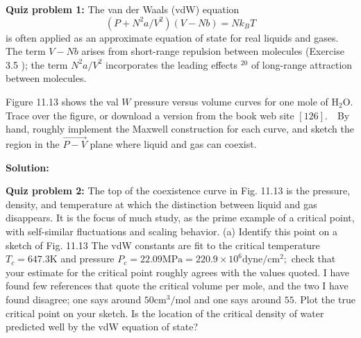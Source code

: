 \documentclass[10pt]{article}
\newenvironment{Solution}
    {\textbf{Solution:}
    
    \vspace{5mm}
    \begin{tcolorbox}
    }
    {
    \end{tcolorbox}
    \vspace{5mm}
    }
\begin{document}
\noindent\textbf{Quiz problem 1:}  The van der Waals (vdW) equation
$$
\left(P+N^{2} a / V^{2}\right)(V-N b)=N k_{B} T
$$
is often applied as an approximate equation of state for real liquids and gases. The term $V-N b$ arises from short-range repulsion between molecules (Exercise 3.5 ); the term $N^{2} a / V^{2}$ incorporates the leading effects $^{20}$ of long-range attraction between molecules.

Figure 11.13 shows the val $W$ pressure versus volume curves for one mole of $\mathrm{H}_{2} \mathrm{O}$. Trace over the figure, or download a version from the book web site $[126] . \quad$By hand, roughly implement the
Maxwell construction for each curve, and sketch
the region in the $\overrightarrow{P-V}$ plane where liquid and gas can coexist.

\begin{Solution}

\end{Solution}


\noindent\textbf{Quiz problem 2:} The top of the coexistence curve in Fig. 11.13 is the pressure, density, and temperature at which the distinction between liquid and gas disappears. It is the focus of much study, as the prime example of a critical point, with self-similar fluctuations and scaling behavior.
(a) Identify this point on a sketch of Fig. 11.13 The vdW constants are fit to the critical temperature $T_{c}=647.3 \mathrm{K}$ and pressure $P_{c} = 22.09 \mathrm{MPa}=220.9 \times 10^{6} \mathrm{dyne} / \mathrm{cm}^{2} ;$ check that
your estimate for the critical point roughly agrees with the values quoted. I have found few references that quote the critical volume per mole, and the two I have found disagree; one says around $50 \mathrm{cm}^{3} / \mathrm{mol}$ and one says around $55 .$ Plot the true critical point on your sketch. Is the location of the critical density of water predicted well by the vdW equation of state?
\end{document}
